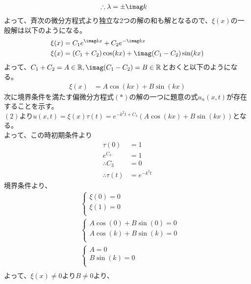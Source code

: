 \documentclass[dvipdfmx,titlepage, 11pt, a4paper]{jsarticle}%
\begin{document}
\begin{enumerate}[(1)]
\begin{align*}
            \therefore \lambda &= \pm \imag k
        \end{align*}
    よって、斉次の微分方程式より独立な2つの解の和も解となるので、$\xi(x)$の一般解は以下のようになる。
        \begin{align*}
            \xi (x) &= C_1 e^{\imag kx} + C_2 e^{-\imag kx}\\
            \xi (x) &= (C_1 + C_2)\cos (kx) + \imag(C_1 - C_2)\sin (kx)
        \end{align*}
        よって、$C_1 + C_2 = A \in \mathbb{R}, \imag(C_1 - C_2) = B\in\mathbb{R}$とおくと以下のようになる。
        \begin{align*}
            \xi (x) &= A\cos (kx) + B\sin (kx)
        \end{align*}
        次に境界条件を満たす偏微分方程式$(*)$の解の一つに題意の式$u_n(x, t)$が存在することを示す。\\
        $(2)$より$u(x, t) = \xi (x)\tau (t) = e^{-k^2 t + C_3}(A\cos (kx) + B\sin (kx))$となる。\\
        よって、この時初期条件より
        \begin{align*}
            \tau (0) &= 1\\
            e^{C_3} &= 1\\
            \therefore C_3 &= 0\\
            \therefore \tau (t) &= e^{-k^2t}
        \end{align*}
        境界条件より、
        \begin{align*}
            &\begin{cases}
                \xi(0) = 0\\
                \xi(1) = 0\\
            \end{cases}\\
            &\begin{cases}
                A\cos (0) + B\sin (0) = 0\\
                A\cos (k) + B\sin (k) = 0\\
            \end{cases}\\
            &\begin{cases}
                A = 0\\
                B\sin (k) = 0\\
            \end{cases}\\
        \end{align*}
        よって、$\xi (x) \neq 0$より$B \neq 0$より、

\end{enumerate}
\end{document}
